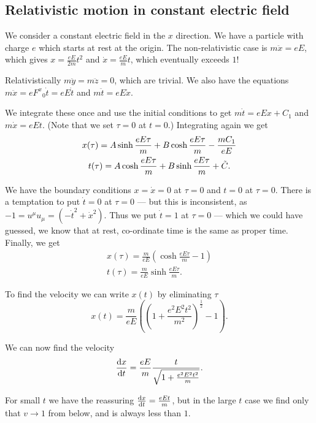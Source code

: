 \documentclass{notes}
\begin{document}
\subsection{Relativistic motion in constant electric field}

We consider a constant electric field in the $x$ direction.  We
have a particle with charge $e$ which starts at rest at the origin.  The
non-relativistic case is $m \ddot{x} = e E$, which gives
$x = \frac{e E}{2 m} t^2$ and $\dot{x} = \frac{e E}{m} t$, which eventually
exceeds $1$!

Relativistically $m \ddot{y} = m \ddot{z} = 0$, which are trivial.  We also
have the equations $m \ddot{x} = e F^x{}_0 \dot{t} = e E \dot{t}$
and $m \ddot{t} = e E \dot{x}$.


We integrate these once and use the initial conditions to get
$m \dot{t} = e E x + C_1$ and $m \dot{x} = e E t$.  (Note that we
set $\tau = 0$ at $t = 0$.)  Integrating again we get
\begin{gather*}
x(\tau) = A \sinh \frac{e E \tau}{m} + B \cosh \frac{e E \tau}{m}
- \frac{m C_1}{e E} \\
t(\tau) = A \cosh \frac{e E \tau}{m} + B \sinh \frac{e E \tau}{m}
+ \Tilde{C}.
\end{gather*}

We have the boundary conditions $x = \dot{x} = 0$ at $\tau = 0$ and
$t = 0$ at $\tau = 0$.  There is a temptation to put $\dot{t} = 0$
at $\tau = 0$ --- but this is inconsistent, as
$-1 = u^\mu u_\mu = (-\dot{t}^2 + \dot{x}^2)$.  Thus we put $\dot{t} = 1$
at $\tau = 0$ --- which we could have guessed, we know that at rest,
co-ordinate time is the same as proper time.  Finally, we get
\begin{gather*}
x(\tau) = \frac{m}{e E}\left( \cosh \frac{e E \tau}{m} - 1 \right) \\
t(\tau) = \frac{m}{e E} \sinh \frac{e E \tau}{m}.
\end{gather*}

To find the velocity we can write $x(t)$ by eliminating $\tau$
\[
x(t) = \frac{m}{e E} \left( \left( 1 + \frac{e^2 E^2 t^2}{m^2}
\right)^{\frac{1}{2}} - 1 \right).
\]

We can now find the velocity
\[
\frac{\mathrm{d} x}{\mathrm{d} t} = \frac{e E}{m}\frac{t}{\sqrt{1 + \frac{e^2 E^2 t^2}{m}}}.
\]

For small $t$ we have the reassuring $\frac{\mathrm{d} x}{\mathrm{d} t} = \frac{e E t}{m}$,
but in the large $t$ case we find only that $v \to 1$ from below, and
is always less than $1$.
\end{document}
